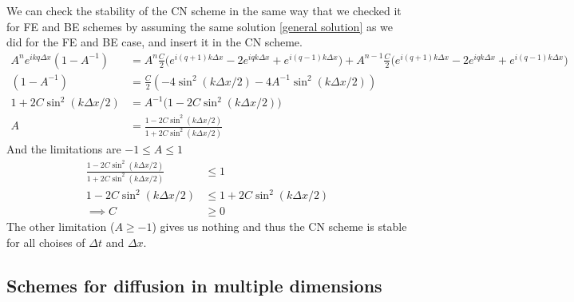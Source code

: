 \documentclass[a4paper,english, 10pt, twoside]{article}
\begin{document}
We can check the stability of the CN scheme in the same way that we checked it for FE and BE schemes by assuming the same solution 
\ref{general solution} as we did for the FE and BE case, and insert it in the CN scheme.
\begin{align*}
 A^ne^{ikq\Delta x}(1-A^{-1}) &= A^n\frac{C}{2}\big(e^{i(q+1)k\Delta x} -2e^{iqk\Delta x} +e^{i(q-1)k\Delta x}\big) + 
 A^{n-1}\frac{C}{2}\big(e^{i(q+1)k\Delta x} -2e^{iqk\Delta x} +e^{i(q-1)k\Delta x}\big) \\
 (1-A^{-1}) &= \frac{C}{2}\left(-4\sin^2(k\Delta x/2) -4A^{-1}\sin^2(k\Delta x/2)\right) \\
 1+2C\sin^2(k\Delta x/2) &= A^{-1}\big(1-2C\sin^2(k\Delta x/2)\big) \\
 A &= \frac{1-2C\sin^2(k\Delta x/2)}{1+2C\sin^2(k\Delta x/2)}
\end{align*}
And the limitations are $-1\leq A \leq 1$
\begin{align*}
\frac{1-2C\sin^2(k\Delta x/2)}{1+2C\sin^2(k\Delta x/2)} &\leq 1 \\
1-2C\sin^2(k\Delta x/2) &\leq 1+2C\sin^2(k\Delta x/2)\\
\implies C &\geq 0
\end{align*}
The other limitation ($A\geq -1$) gives us nothing and thus the CN scheme is stable for all choises of $\Delta t$ and $\Delta x$.

\subsection{Schemes for diffusion in multiple dimensions}
\end{document}

